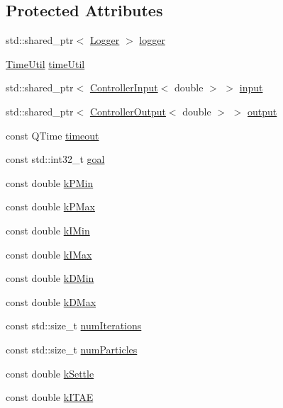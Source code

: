 \subsection*{Protected Attributes}
\begin{DoxyCompactItemize}
\item 
std\+::shared\+\_\+ptr$<$ \mbox{\hyperlink{classokapi_1_1Logger}{Logger}} $>$ \mbox{\hyperlink{classokapi_1_1PIDTuner_aaacb94d0dfe0aa5f5d60bb545d8f47c2}{logger}}
\item 
\mbox{\hyperlink{classokapi_1_1TimeUtil}{Time\+Util}} \mbox{\hyperlink{classokapi_1_1PIDTuner_a60b56b9eb8afccaf712e9431cf7f081f}{time\+Util}}
\item 
std\+::shared\+\_\+ptr$<$ \mbox{\hyperlink{classokapi_1_1ControllerInput}{Controller\+Input}}$<$ double $>$ $>$ \mbox{\hyperlink{classokapi_1_1PIDTuner_a40ac034c005ba51661547aa5bcfa489a}{input}}
\item 
std\+::shared\+\_\+ptr$<$ \mbox{\hyperlink{classokapi_1_1ControllerOutput}{Controller\+Output}}$<$ double $>$ $>$ \mbox{\hyperlink{classokapi_1_1PIDTuner_ae97a91fa08ed6cfaabede054a550086a}{output}}
\item 
const Q\+Time \mbox{\hyperlink{classokapi_1_1PIDTuner_aaaffccb9f7957dd55231828eaea7d1aa}{timeout}}
\item 
const std\+::int32\+\_\+t \mbox{\hyperlink{classokapi_1_1PIDTuner_ab93cfb26d55a413ed1dbe4a3b3a4b593}{goal}}
\item 
const double \mbox{\hyperlink{classokapi_1_1PIDTuner_a9440d32122ec8700ba94a5814324f250}{k\+P\+Min}}
\item 
const double \mbox{\hyperlink{classokapi_1_1PIDTuner_a3997e68a567dbaaa0e4b5fccc930058e}{k\+P\+Max}}
\item 
const double \mbox{\hyperlink{classokapi_1_1PIDTuner_ab3bce230ab8d7599117de6d589fc5246}{k\+I\+Min}}
\item 
const double \mbox{\hyperlink{classokapi_1_1PIDTuner_a911b99991fe5d49e0065000481fa82b1}{k\+I\+Max}}
\item 
const double \mbox{\hyperlink{classokapi_1_1PIDTuner_ab8e1906b058523d1896e27db54a4cec7}{k\+D\+Min}}
\item 
const double \mbox{\hyperlink{classokapi_1_1PIDTuner_a68227ac895b938a1f227cc5af8145c57}{k\+D\+Max}}
\item 
const std\+::size\+\_\+t \mbox{\hyperlink{classokapi_1_1PIDTuner_ad37777a3d7646873c2384e40a567c2db}{num\+Iterations}}
\item 
const std\+::size\+\_\+t \mbox{\hyperlink{classokapi_1_1PIDTuner_ae95d28fbed3acea4722a8f24a15d7d0b}{num\+Particles}}
\item 
const double \mbox{\hyperlink{classokapi_1_1PIDTuner_a67bb281ee451f205cebd4f8dcd7b3c1f}{k\+Settle}}
\item 
const double \mbox{\hyperlink{classokapi_1_1PIDTuner_aacfd3c10e26b2c4001233904a66c7e5e}{k\+I\+T\+AE}}
\end{DoxyCompactItemize}
